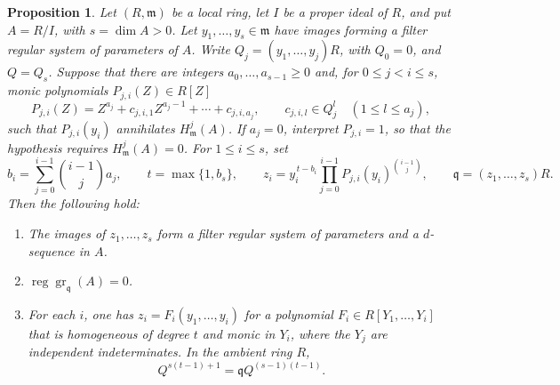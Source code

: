 \documentclass[11pt,reqno]{amsart}
\numberwithin{equation}{section}
\newtheorem{proposition}[theorem]{Proposition}
\theoremstyle{definition}
\newcommand{\m}{\mathfrak m}
\begin{document}
\begin{proposition}\label{prop:triangular-parameters}
Let $(R,\m)$ be a local ring, let $I$ be a proper ideal of $R$, and
put $A=R/I$, with $s=\dim A>0$. Let $y_1,\ldots,y_s\in\m$ have images forming a filter regular
system of parameters of $A$.  Write $Q_j=(y_1,\ldots,y_j)R$, with
$Q_0=0$, and $Q=Q_s$.
Suppose that there are integers $a_0,\ldots,a_{s-1}\ge0$ and, for
$0\le j<i\le s$, monic polynomials $P_{j,i}(Z)\in R[Z]$
\begin{equation}\label{eq:triangular-annihilators}
 P_{j,i}(Z)=Z^{a_j}+c_{j,i,1}Z^{a_j-1}+\cdots+c_{j,i,a_j},
 \qquad c_{j,i,l}\in Q_j^l\quad(1\le l\le a_j),
\end{equation}
such that $P_{j,i}(y_i)$ annihilates $H^j_{\m}(A)$.  If $a_j=0$,
interpret $P_{j,i}=1$, so that the hypothesis requires
$H^j_{\m}(A)=0$.
For $1\le i\le s$, set
\[
 b_i=\sum_{j=0}^{i-1}\binom{i-1}{j}a_j,
 \qquad t=\max\{1,b_s\},
 \qquad
 z_i=y_i^{\,t-b_i}
       \prod_{j=0}^{i-1}P_{j,i}(y_i)^{\binom{i-1}{j}},
 \qquad \mathfrak q=(z_1,\ldots,z_s)R.
\]
Then the following hold:
\begin{enumerate}
\item The images of $z_1,\ldots,z_s$ form a filter regular system of
parameters and a $d$-sequence in $A$.
\item $\operatorname{reg}\operatorname{gr}_{\mathfrak q}(A)=0$.
\item For each $i$, one has $z_i=F_i(y_1,\ldots,y_i)$ for a polynomial
$F_i\in R[Y_1,\ldots,Y_i]$ that is homogeneous of degree $t$
and monic in $Y_i$, where the $Y_j$ are independent indeterminates.
In the ambient ring $R$,
\begin{equation}\label{eq:ambient-balanced-identity}
 Q^{s(t-1)+1}=\mathfrak q Q^{(s-1)(t-1)}.
\end{equation}
\end{enumerate}
\end{proposition}
\end{document}
